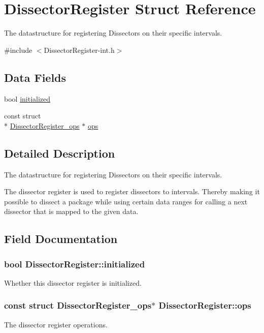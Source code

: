 \hypertarget{struct_dissector_register}{\section{Dissector\-Register Struct Reference}
\label{struct_dissector_register}
}


The datastructure for registering Dissectors on their specific intervals.  




{\ttfamily \#include $<$Dissector\-Register-\/int.\-h$>$}

\subsection*{Data Fields}
\begin{DoxyCompactItemize}
\item 
bool \hyperlink{struct_dissector_register_ac11ffde1776843c94f5ff251ec54710b}{initialized}
\item 
const struct \\*
\hyperlink{struct_dissector_register__ops}{Dissector\-Register\-\_\-ops} $\ast$ \hyperlink{struct_dissector_register_acb5f585a3d5d7dbeca84a74990bbaad8}{ops}
\end{DoxyCompactItemize}


\subsection{Detailed Description}
The datastructure for registering Dissectors on their specific intervals. 

The dissector register is used to register dissectors to intervals. Thereby making it possible to dissect a package while using certain data ranges for calling a next dissector that is mapped to the given data. 

\subsection{Field Documentation}
\hypertarget{struct_dissector_register_ac11ffde1776843c94f5ff251ec54710b}{
\subsubsection[{initialized}]{\setlength{\rightskip}{0pt plus 5cm}bool Dissector\-Register\-::initialized}}\label{struct_dissector_register_ac11ffde1776843c94f5ff251ec54710b}
Whether this dissector register is initialized. \hypertarget{struct_dissector_register_acb5f585a3d5d7dbeca84a74990bbaad8}{
\subsubsection[{ops}]{\setlength{\rightskip}{0pt plus 5cm}const struct {\bf Dissector\-Register\-\_\-ops}$\ast$ Dissector\-Register\-::ops}}\label{struct_dissector_register_acb5f585a3d5d7dbeca84a74990bbaad8}
The dissector register operations. 


